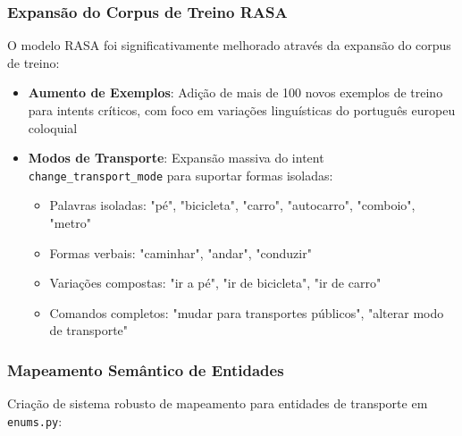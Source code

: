 \documentclass{report}
\begin{document}
\subsubsection{Expansão do Corpus de Treino RASA}

O modelo RASA foi significativamente melhorado através da expansão do corpus de treino:

\begin{itemize}
    \item \textbf{Aumento de Exemplos}: Adição de mais de 100 novos exemplos de treino para intents críticos, com foco em variações linguísticas do português europeu coloquial
    
    \item \textbf{Modos de Transporte}: Expansão massiva do intent \texttt{change\_transport\_mode} para suportar formas isoladas:
    \begin{itemize}
        \item Palavras isoladas: "pé", "bicicleta", "carro", "autocarro", "comboio", "metro"
        \item Formas verbais: "caminhar", "andar", "conduzir"
        \item Variações compostas: "ir a pé", "ir de bicicleta", "ir de carro"
        \item Comandos completos: "mudar para transportes públicos", "alterar modo de transporte"
    \end{itemize}
    
\end{itemize}

\subsubsection{Mapeamento Semântico de Entidades}

Criação de sistema robusto de mapeamento para entidades de transporte em \texttt{enums.py}:
\end{document}
